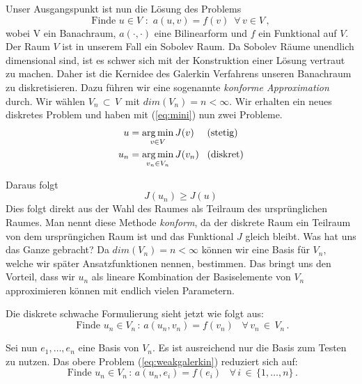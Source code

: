 Unser Ausgangspunkt ist nun die Lösung des Problems
\begin{equation} \label{eq:cont}
\text{Finde } u \in V \text{ : } \, a(u,v) = f(v) \, \, \, \forall \, v \in V \, ,
\end{equation}
wobei V ein Banachraum, $a(\cdot,\cdot)$ eine Bilinearform und $f$ ein Funktional auf $V$. Der Raum $V$ ist in unserem Fall ein Sobolev Raum.
Da Sobolev Räume unendlich dimensional sind, ist es schwer sich mit der Konstruktion einer Lösung vertraut zu machen. Daher ist die Kernidee des Galerkin Verfahrens unseren Banachraum zu diskretisieren. 
Dazu führen wir eine sogenannte \textit{konforme Approximation} durch.
Wir wählen $V_{n} \, \subset \,V \, $ mit $dim(V_{n}) = n < \infty $. Wir erhalten ein neues diskretes Problem und haben mit (\ref{eq:mini}) nun zwei Probleme.
\begin{equation*}
\begin{aligned}
u &= \operatorname*{arg\,min}_{v \in V} J(v)  \, \, \, \, \, \, \text{ (stetig)}\\
u_n &= \operatorname*{arg\,min}_{v_n \in V_n} J(v_n) \, \, \, \text{ (diskret)}
\end{aligned}
\end{equation*}

Daraus folgt
\begin{equation*}
J(u_n) \geq J(u)
\end{equation*}
Dies folgt direkt aus der Wahl des Raumes als Teilraum des ursprünglichen Raumes. Man nennt diese Methode \textit{konform}, da der diskrete Raum ein Teilraum von dem ursprüngichen Raum ist und das Funktional $J$ gleich bleibt. 
Was hat uns das Ganze gebracht? Da $dim(V_n) = n < \infty$ können wir eine Basis für $V_n$, welche wir später Ansatzfunktionen nennen, bestimmen. Das bringt uns den Vorteil, dass wir $u_n$ als lineare Kombination der Basiselemente von $V_n$ approximieren können mit endlich vielen Parametern. 

Die diskrete schwache Formulierung sieht jetzt wie folgt aus:
\begin{equation}
\text{ Finde } u_n \in V_n  \, :  \, a(u_n,v_n)=f(v_n)  \, \, \,  \, \, \forall \, v_n \, \in \, V_n \, . \label{eq:weakgalerkin} 
\end{equation}

Sei nun $e_1, \dots , e_n$ eine Basis von $V_n$. Es ist ausreichend nur die Basis zum Testen zu nutzen.
Das obere Problem (\ref{eq:weakgalerkin}) reduziert sich auf:
\begin{equation} \label{eq:weak1}
\text{ Finde } u_n \in V_n  \, :  \, a(u_n,e_i)=f(e_i)  \, \, \,  \, \, \forall \, i \, \in \, \{1,\dots,n\} \, .
\end{equation}

